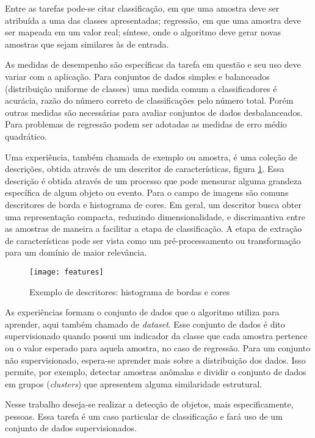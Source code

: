 Entre as tarefas pode-se citar classificação, em que uma amostra deve ser atribuída a uma das classes apresentadas; regressão, em que uma amostra deve ser mapeada em um valor real; síntese, onde o algoritmo deve gerar novas amostras que sejam similares às de entrada.

As medidas de desempenho são específicas da tarefa em questão e seu uso deve variar com a aplicação. Para conjuntos de dados simples e balanceados (distribuição uniforme de classes) uma medida comum a classificadores é acurácia, razão do número correto de classificações pelo número total. Porém outras medidas são necessárias para avaliar conjuntos de dados desbalanceados. Para problemas de regressão podem ser adotadas as medidas de erro médio quadrático.

Uma experiência, também chamada de exemplo ou amostra, é uma coleção de descrições, obtida através de um descritor de características, figura \ref{fig:features}. Essa descrição é obtida através de um processo que pode mensurar alguma grandeza específica de algum objeto ou evento. Para o campo de imagens são comuns descritores de borda e histograma de cores. Em geral, um descritor busca obter uma representação compacta, reduzindo dimensionalidade, e discrimantiva entre as amostras de maneira a facilitar a etapa de classificação. A etapa de extração de características pode ser vista como um pré-processamento ou transformação para um domínio de maior relevância.

\begin{figure}[h]
\centering
\texttt{[image: features]}
\caption{Exemplo de descritores: histograma de bordas e cores}
\label{fig:features}
\end{figure}

As experiências formam o conjunto de dados que o algoritmo utiliza para aprender, aqui também chamado de \textit{dataset}. Esse conjunto de dados é dito supervisionado quando possui um indicador da classe que cada amostra pertence ou o valor esperado para aquela amostra, no caso de regressão. Para um conjunto não supervisionado, espera-se aprender mais sobre a distribuição dos dados. Isso permite, por exemplo, detectar amostras anômalas e dividir o conjunto de dados em grupos (\textit{clusters}) que apresentem alguma similaridade estrutural.

Nesse trabalho deseja-se realizar a detecção de objetos, mais especificamente, pessoas. Essa tarefa é um caso particular de classificação e fará uso de um conjunto de dados supervisionados.

